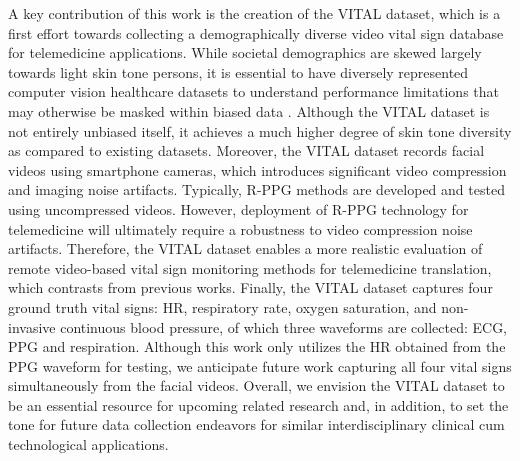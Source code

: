 A key contribution of this work is the creation of the VITAL dataset, which is a first effort towards collecting a demographically diverse video vital sign database for telemedicine applications. While societal demographics are skewed largely towards light skin tone persons, it is essential to have diversely represented computer vision healthcare datasets to understand performance limitations that may otherwise be masked within biased data \cite{cahan_putting_2019}. Although the VITAL dataset is not entirely unbiased itself, it achieves a much higher degree of skin tone diversity as compared to existing datasets. Moreover, the VITAL dataset records facial videos using smartphone cameras, which introduces significant video compression and imaging noise artifacts. Typically, R-PPG methods are developed and tested using uncompressed videos. However, deployment of R-PPG technology for telemedicine will ultimately require a robustness to video compression noise artifacts. Therefore, the VITAL dataset enables a more realistic evaluation of remote video-based vital sign monitoring methods for telemedicine translation, which contrasts from previous works. Finally, the VITAL dataset captures four ground truth vital signs: HR, respiratory rate, oxygen saturation, and non-invasive continuous blood pressure, of which three waveforms are collected: ECG, PPG and respiration. Although this work only utilizes the HR obtained from the PPG waveform for testing, we anticipate future work capturing all four vital signs simultaneously from the facial videos. Overall, we envision the VITAL dataset to be an essential resource for upcoming related research and, in addition, to set the tone for future data collection endeavors for similar interdisciplinary clinical cum technological applications.

